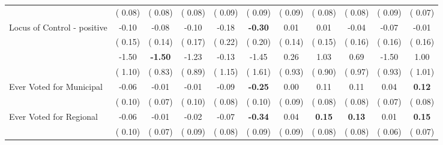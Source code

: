 \begin{tabular}{l c c c c c c c c c c}
& (     0.08) & (     0.08) & (     0.08) & (     0.09) & (     0.09) & (     0.09) & (     0.08) & (     0.08) & (     0.09) & (     0.07) \\
Locus of Control - positive &     -0.10 &     -0.08 &     -0.10 &     -0.18 & \textbf{     -0.30 } &      0.01 &      0.01 &     -0.04 &     -0.07 &     -0.01 \\
& (     0.15) & (     0.14) & (     0.17) & (     0.22) & (     0.20) & (     0.14) & (     0.15) & (     0.16) & (     0.16) & (     0.16) \\
&     -1.50 & \textbf{     -1.50 } &     -1.23 &     -0.13 &     -1.45 &      0.26 &      1.03 &      0.69 &     -1.50 &      1.00 \\
& (     1.10) & (     0.83) & (     0.89) & (     1.15) & (     1.61) & (     0.93) & (     0.90) & (     0.97) & (     0.93) & (     1.01) \\
Ever Voted for Municipal &     -0.06 &     -0.01 &     -0.01 &     -0.09 & \textbf{     -0.25 } &      0.00 &      0.11 &      0.11 &      0.04 & \textbf{     0.12} \\
& (     0.10) & (     0.07) & (     0.10) & (     0.08) & (     0.10) & (     0.09) & (     0.08) & (     0.08) & (     0.07) & (     0.08) \\
Ever Voted for Regional &     -0.06 &     -0.01 &     -0.02 &     -0.07 & \textbf{     -0.34 } &      0.04 & \textbf{      0.15 } & \textbf{      0.13 } &      0.01 & \textbf{     0.15} \\
& (     0.10) & (     0.07) & (     0.09) & (     0.08) & (     0.09) & (     0.09) & (     0.08) & (     0.08) & (     0.06) & (     0.07) \\
\bottomrule
\end{tabular}

